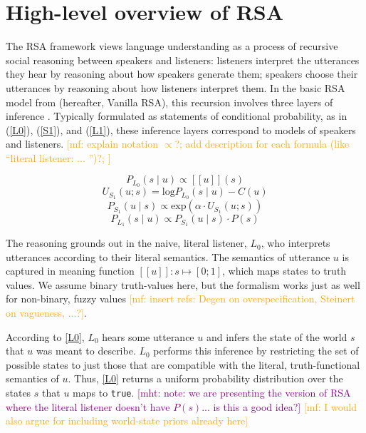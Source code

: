 \documentclass{sp}
\newcommand{\mf}[1]{\textcolor{orange}{[mf: #1]}}
\newcommand{\mht}[1]{\textcolor{purple}{[mht: #1]}}
\newcommand{\sem}[1]{\ensuremath{[\![#1]\!]}}
\begin{document}
\section{High-level overview of RSA} \label{overview}

The RSA framework views language understanding as a process of recursive social reasoning between speakers and listeners: listeners interpret the utterances they hear by reasoning about how speakers generate them; speakers choose their utterances by reasoning about how listeners interpret them. In the basic RSA model from \cite{frankgoodman2012} (hereafter, Vanilla RSA), this recursion involves three layers of inference \citep[for an earlier proposal of this architecture see][]{BenzvanRooijOptimalAssertions2007}. Typically formulated as statements of conditional probability, as in (\ref{L0}), (\ref{S1}), and (\ref{L1}), these inference layers correspond to models of speakers and listeners. \mf{explain notation $\propto$?; add description for each formula (like ``literal listener: ... '')?; }

\begin{equation} \label{L0}
P_{L_0}(s \mid u) \propto \sem{u}(s)
\end{equation}
\begin{equation} \label{U}
U_{S_1}(u; s) = \textrm{log}P_{L_0}(s \mid u) - C(u)
\end{equation}
\begin{equation} \label{S1}
P_{S_1}(u \mid s) \propto \textrm{exp}(\alpha \cdot U_{S_1}(u;s))
\end{equation}
\begin{equation} \label{L1}
P_{L_1}(s \mid u) \propto P_{S_1}(u \mid s) \cdot P(s)
\end{equation}

The reasoning grounds out in the naive, literal listener, $L_0$, who interprets utterances
according to their literal semantics. The semantics of utterance $u$ is captured in meaning
function $\sem{u} \colon s \mapsto [0;1]$, which maps states to truth values. We assume binary
truth-values here, but the formalism works just as well for non-binary, fuzzy values
\mf{insert refs: Degen on overspecification, Steinert on vagueness, ...?}.

According to \eqref{L0}, $L_0$ hears some utterance $u$ and infers the state of the world $s$ that $u$ was
meant to describe. $L_0$ performs this inference by restricting the set of possible states to just those that are compatible
with the literal, truth-functional semantics of $u$.
Thus, \eqref{L0} returns a uniform probability distribution over the states $s$ that $u$ maps to \texttt{true}.
\mht{note: we are presenting the version of RSA where the literal listener doesn't have $P(s)$... is this a good idea?}
\mf{I would also argue for including world-state priors already here}
\end{document}
